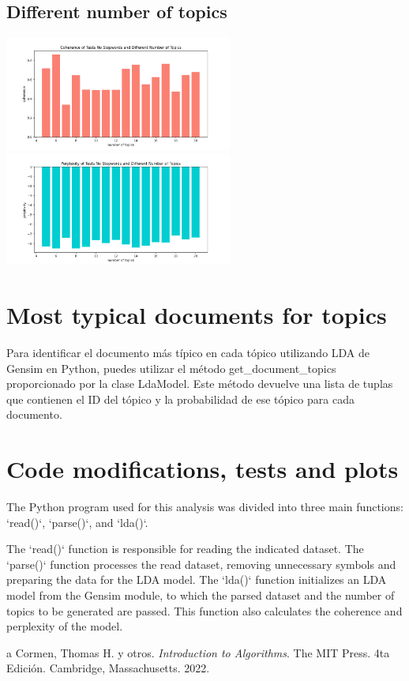 \documentclass[10pt]{article} %
\begin{document}
	\subsection{Different number of topics}
	\begin{center}
		\includegraphics[width=7.5cm]{images/coherence_no_stopwords_diff_n_topics_2}
		\includegraphics[width=7.5cm]{images/perplexity_no_stopwords_diff_n_topics_2}
	\end{center}
	
	\section{Most typical documents for topics}
	Para identificar el documento más típico en cada tópico utilizando LDA de Gensim en Python, puedes utilizar el método get\_document\_topics proporcionado por la clase LdaModel. Este método devuelve una lista de tuplas que contienen el ID del tópico y la probabilidad de ese tópico para cada documento.
	
	
	\section{Code modifications, tests and plots}
	
	The Python program used for this analysis was divided into three main functions: `read()`, `parse()`, and `lda()`.
	
	The `read()` function is responsible for reading the indicated dataset. The `parse()` function processes the read dataset, removing unnecessary symbols and preparing the data for the LDA model. The `lda()` function initializes an LDA model from the Gensim module, to which the parsed dataset and the number of topics to be generated are passed. This function also calculates the coherence and perplexity of the model.
	
	
	\begin{thebibliography}
		a
		 Cormen, Thomas H. y otros. \emph{Introduction to Algorithms}. 
		The MIT Press.
		4ta Edici\'on.		
		Cambridge, Massachusetts.
		2022.
	\end{thebibliography}
\end{document}
